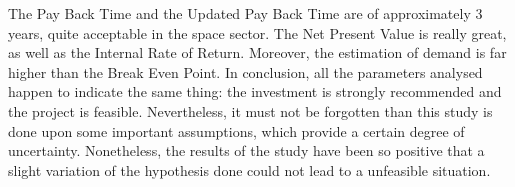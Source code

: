 The Pay Back Time and the Updated Pay Back Time are of approximately 3 years, quite acceptable in the space sector. The Net Present Value is really great, as well as the Internal Rate of Return. Moreover, the estimation of demand is far higher than the Break Even Point. In conclusion, all the parameters analysed happen to indicate the same thing: the investment is strongly recommended and the project is feasible. Nevertheless, it must not be forgotten than this study is done upon some important assumptions, which provide a certain degree of uncertainty. Nonetheless, the results of the study have been so positive that a slight variation of the hypothesis done could not lead to a unfeasible situation. 

